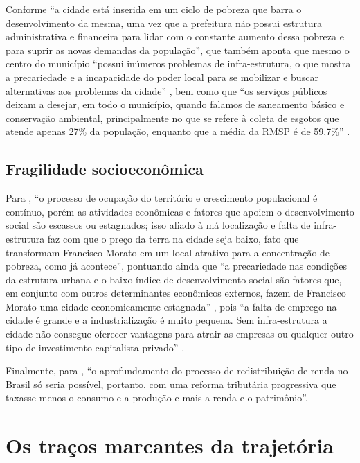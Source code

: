 	Conforme  ``a cidade está inserida em um ciclo de pobreza que barra o desenvolvimento da	mesma, uma vez que a prefeitura não possui estrutura administrativa e financeira para lidar com o constante aumento dessa pobreza e para suprir as novas demandas da população'', que também aponta que mesmo o centro do município ``possui inúmeros problemas de infra-estrutura, o que mostra a precariedade e a incapacidade do poder local para	se mobilizar e buscar alternativas aos problemas da cidade'' \cite[p.61]{cassiele2007a}, bem como que ``os serviços públicos deixam a desejar, em todo o município, quando falamos de saneamento básico e conservação ambiental, principalmente no que se refere à coleta de esgotos que atende apenas 27\% da população, enquanto que a média da RMSP é de 59,7\%'' \cite[p.63]{cassiele2007a}.
	
	\subsection{Fragilidade socioeconômica}
	
	Para , ``o processo de ocupação do território e crescimento populacional é contínuo, porém as atividades econômicas e fatores que apoiem o desenvolvimento social são escassos ou estagnados; isso aliado à má localização e falta de infra-estrutura faz com que o preço da terra na cidade seja baixo, fato que transformam Francisco Morato em um local atrativo para a concentração de pobreza, como já acontece'', pontuando ainda que ``a precariedade nas condições da estrutura urbana e o baixo índice de desenvolvimento
	social são fatores que, em conjunto com outros determinantes econômicos externos, fazem de Francisco Morato uma cidade economicamente estagnada'' \cite[p.92]{cassiele2007a}, pois ``a falta de emprego na cidade é grande e a industrialização é muito pequena. Sem infra-estrutura a cidade não consegue oferecer vantagens para atrair as empresas ou qualquer outro
	tipo de investimento capitalista privado'' \cite[p.99]{cassiele2007a}.
	
	Finalmente, para \cite[p.52]{carvalho2018a}, ``o aprofundamento do processo de redistribuição de renda no Brasil só seria possível, portanto, com uma reforma tributária progressiva que taxasse menos o consumo e a produção e mais a renda e o patrimônio''.
	
	\section{Os traços marcantes da trajetória} \label{sec:tracos-sumario}
	
